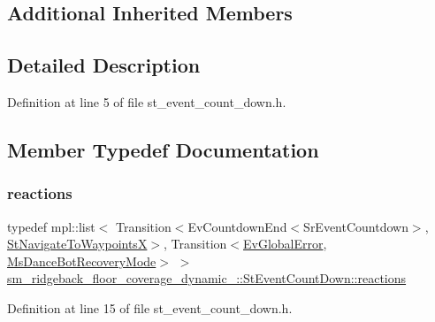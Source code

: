 \subsection*{Additional Inherited Members}


\subsection{Detailed Description}


Definition at line 5 of file st\+\_\+event\+\_\+count\+\_\+down.\+h.



\subsection{Member Typedef Documentation}
\mbox{\label{structsm__ridgeback__floor__coverage__dynamic__1_1_1StEventCountDown_afe82e1a76bd4a327fbbfcbff20224557}} 
\subsubsection{\texorpdfstring{reactions}{reactions}}
{\footnotesize\ttfamily typedef mpl\+::list$<$ Transition$<$Ev\+Countdown\+End$<$Sr\+Event\+Countdown$>$, \hyperlink{structsm__ridgeback__floor__coverage__dynamic__1_1_1StNavigateToWaypointsX}{St\+Navigate\+To\+WaypointsX}$>$, Transition$<$\hyperlink{structsm__ridgeback__floor__coverage__dynamic__1_1_1EvGlobalError}{Ev\+Global\+Error}, \hyperlink{classsm__ridgeback__floor__coverage__dynamic__1_1_1MsDanceBotRecoveryMode}{Ms\+Dance\+Bot\+Recovery\+Mode}$>$ $>$ \hyperlink{structsm__ridgeback__floor__coverage__dynamic__1_1_1StEventCountDown_afe82e1a76bd4a327fbbfcbff20224557}{sm\+\_\+ridgeback\+\_\+floor\+\_\+coverage\+\_\+dynamic\+\_\+::\+St\+Event\+Count\+Down\+::reactions}}



Definition at line 15 of file st\+\_\+event\+\_\+count\+\_\+down.\+h.



